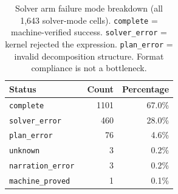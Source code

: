 \begin{table}[t]
\centering
\caption{Solver arm failure mode breakdown (all 1,643 solver-mode cells). \texttt{complete} = machine-verified success. \texttt{solver\_error} = kernel rejected the expression. \texttt{plan\_error} = invalid decomposition structure. Format compliance is not a bottleneck.}
\label{tab:failure-modes}
\begin{tabular}{@{}lrr@{}}
\toprule
Status & Count & Percentage \\
\midrule
\texttt{complete            } &   1101 &   67.0\% \\
\texttt{solver_error        } &    460 &   28.0\% \\
\texttt{plan_error          } &     76 &    4.6\% \\
\texttt{unknown             } &      3 &    0.2\% \\
\texttt{narration_error     } &      3 &    0.2\% \\
\texttt{machine_proved      } &      1 &    0.1\% \\
\bottomrule
\end{tabular}
\end{table}

